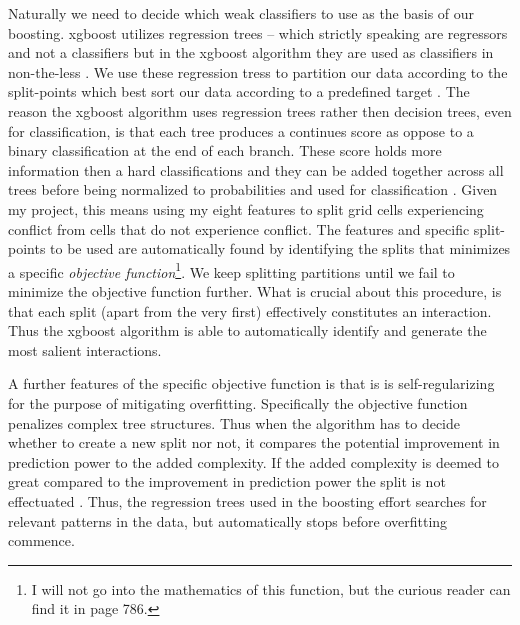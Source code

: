 \documentclass[a4paper]{article}
\begin{document}
Naturally we need to decide which weak classifiers to use as the basis of our boosting. xgboost utilizes regression trees -- which strictly speaking are regressors and not a classifiers but in the xgboost algorithm they are used as classifiers in non-the-less \citep[786]{Chen_2016}. We use these regression tress to partition our data according to the split-points which best sort our data according to a predefined target \citep[786]{Chen_2016}. The reason the xgboost algorithm uses regression trees rather then decision trees, even for classification, is that each tree produces a continues score as oppose to a binary classification at the end of each branch. These score holds more information then a hard classifications and they can be added together across all trees before being normalized to probabilities and used for classification \cite[786]{Chen_2016}. Given my project, this means using my eight features to split grid cells experiencing conflict from cells that do not experience conflict. The features and specific split-points to be used are automatically found by identifying the splits that minimizes a specific \emph{objective function}\footnote{I  will not go into the mathematics of this function, but the curious reader can find it in \cite{Chen_2016} page 786.}\citep[786]{Chen_2016}. We keep splitting partitions until we fail to minimize the objective function further\citep[786]{Chen_2016}. What is crucial about this procedure, is that each split (apart from the very first) effectively constitutes an interaction. Thus the xgboost algorithm is able to automatically identify and generate the most salient interactions.\par

A further features of the specific objective function is that is is self-regularizing for the purpose of mitigating overfitting. Specifically the objective function penalizes complex tree structures. Thus when the algorithm has to decide whether to create a new split nor not, it compares the potential improvement in prediction power to the added complexity. If the added complexity is deemed to great compared to the improvement in prediction power the split is not effectuated \cite[787-791]{Chen_2016}. Thus, the regression trees used in the boosting effort searches for relevant patterns in the data, but automatically stops before overfitting commence.\par
\end{document}
